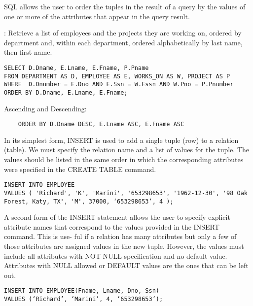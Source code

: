     \par SQL allows the user to order the tuples in the result of a query by the values of one or more of the attributes that appear in the query result.
    \par {}: Retrieve a list of employees and the projects they are working on, ordered by department and, within each department, ordered alphabetically by last name, then first name.
      \begin{verbatim}
SELECT D.Dname, E.Lname, E.Fname, P.Pname 
FROM DEPARTMENT AS D, EMPLOYEE AS E, WORKS_ON AS W, PROJECT AS P  
WHERE  D.Dnumber = E.Dno AND E.Ssn = W.Essn AND W.Pno = P.Pnumber
ORDER BY D.Dname, E.Lname, E.Fname;
      \end{verbatim}
    \par Ascending and Descending:
       \begin{verbatim}   
    ORDER BY D.Dname DESC, E.Lname ASC, E.Fname ASC
      \end{verbatim}


    \par In its simplest form, INSERT is used to add a single tuple (row) to a relation (table). We must specify the relation name and a list of values for the tuple. The values should be listed in the same order in which the corresponding attributes were specified in the CREATE TABLE command.

      \begin{verbatim}
INSERT INTO EMPLOYEE
VALUES ( 'Richard', 'K', 'Marini', '653298653', '1962-12-30', '98 Oak Forest, Katy, TX', 'M', 37000, ‘653298653’, 4 );
      \end{verbatim}

    \par A second form of the INSERT statement allows the user to specify explicit attribute
    names that correspond to the values provided in the INSERT command. This is use-
    ful if a relation has many attributes but only a few of those attributes are assigned
    values in the new tuple. However, the values must include all attributes with NOT
    NULL specification and no default value. Attributes with NULL allowed or DEFAULT
    values are the ones that can be left out.

      \begin{verbatim}
INSERT INTO EMPLOYEE(Fname, Lname, Dno, Ssn)
VALUES (‘Richard’, ‘Marini’, 4, ‘653298653’);
      \end{verbatim}


